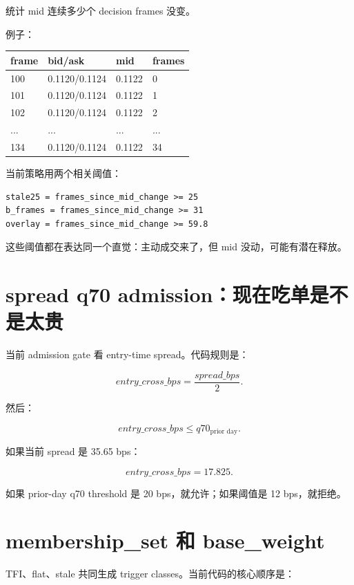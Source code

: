  统计 mid 连续多少个 decision frames 没变。

例子：

\begin{longtable}{p{}p{}p{}p{}}
\toprule
frame & bid/ask & mid & frames \\
\midrule
100 & 0.1120/0.1124 & 0.1122 & 0 \\
101 & 0.1120/0.1124 & 0.1122 & 1 \\
102 & 0.1120/0.1124 & 0.1122 & 2 \\
... & ... & ... & ... \\
134 & 0.1120/0.1124 & 0.1122 & 34 \\
\bottomrule
\end{longtable}

当前策略用两个相关阈值：

\begin{lstlisting}
stale25 = frames_since_mid_change >= 25
b_frames = frames_since_mid_change >= 31
overlay = frames_since_mid_change >= 59.8
\end{lstlisting}

这些阈值都在表达同一个直觉：主动成交来了，但 mid 没动，可能有潜在释放。

\section{spread q70 admission：现在吃单是不是太贵}

当前 admission gate 看 entry-time spread。代码规则是：

\[
entry\_cross\_bps=\frac{spread\_bps}{2}.
\]

然后：

\[
entry\_cross\_bps \le q70_{\text{prior day}}.
\]

如果当前 spread 是 35.65 bps：

\[
entry\_cross\_bps=17.825.
\]

如果 prior-day q70 threshold 是 20 bps，就允许；如果阈值是 12 bps，就拒绝。


\section{membership\_set 和 base\_weight}

TFI、flat、stale 共同生成 trigger classes。当前代码的核心顺序是：

